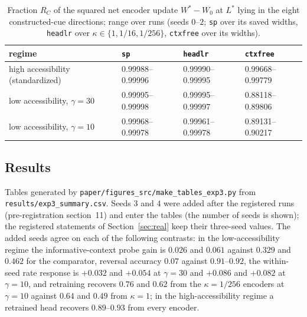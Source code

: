 \begin{table}[h]
\centering\small
\caption{Fraction $R_C$ of the squared net encoder update $W^\ast-W_0$ at
$L^\ast$ lying in the eight constructed-cue directions; range over runs
(seeds $0$--$2$; \texttt{sp} over its saved widths, \texttt{headlr} over
$\kappa\in\{1,1/16,1/256\}$, \texttt{ctxfree} over its widths).}
\label{tab:exp3_proj}
\begin{tabular}{llll}
\toprule
regime & \texttt{sp} & \texttt{headlr} & \texttt{ctxfree} \\
\midrule
high accessibility (standardized) & 0.99988--0.99996 & 0.99990--0.99995 & 0.99668--0.99779 \\
low accessibility, $\gamma=30$ & 0.99995--0.99998 & 0.99995--0.99997 & 0.88118--0.89806 \\
low accessibility, $\gamma=10$ & 0.99968--0.99978 & 0.99961--0.99978 & 0.89131--0.90217 \\
\bottomrule
\end{tabular}
\end{table}

\subsection{Results}
Tables generated by \texttt{paper/figures\_src/make\_tables\_exp3.py} from
\texttt{results/exp3\_summary.csv}.
Seeds $3$ and $4$ were added after the registered runs (pre-registration section~11) and
enter the tables (the number of seeds is shown); the registered statements of
Section~\ref{sec:real} keep their three-seed values. The added seeds agree on each of the following contrasts:
in the low-accessibility regime the informative-context probe gain is $0.026$ and $0.061$
against $0.329$ and $0.462$ for the comparator, reversal accuracy $0.07$ against $0.91$--$0.92$,
the within-seed rate response is $+0.032$ and $+0.054$ at $\gamma=30$ and $+0.086$ and $+0.082$ at
$\gamma=10$, and retraining recovers $0.76$ and $0.62$ from the $\kappa=1/256$ encoders at
$\gamma=10$ against $0.64$ and $0.49$ from $\kappa=1$; in the high-accessibility regime a
retrained head recovers $0.89$--$0.93$ from every encoder.


